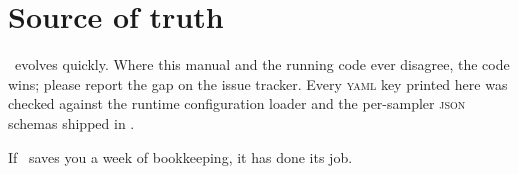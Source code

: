 \section*{Source of truth}

\Jarvis\ evolves quickly. Where this manual and the running code ever disagree, the code
wins; please report the gap on the issue tracker. Every \textsc{yaml} key printed here was
checked against the runtime configuration loader and the per-sampler \textsc{json} schemas
shipped in \schemaref{}.

\vspace{1\baselineskip}
\noindent If \Jarvis\ saves you a week of bookkeeping, it has done its job.
